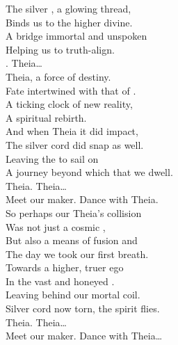
\label{album:the-silver-cord}




The silver , a glowing thread, \\
Binds us to the higher divine. \\
A bridge immortal and unspoken \\
Helping us to truth-align. \\

. Theia… \\

Theia, a force of destiny. \\
Fate intertwined with that of . \\
A ticking clock of new reality, \\
A spiritual rebirth. \\
And when Theia it did impact, \\
The silver cord did snap as well. \\
Leaving the  to sail on \\
A journey beyond which that we dwell. \\

Theia. Theia… \\

Meet our maker. Dance with Theia. \\

So perhaps our Theia's collision \\
Was not just a cosmic , \\
But also a means of fusion and \\
The day we took our first breath. \\
Towards a higher, truer ego \\
In the vast and honeyed . \\
Leaving behind our mortal coil. \\
Silver cord now torn, the spirit flies. \\

Theia. Theia… \\

Meet our maker. Dance with Theia… \\

